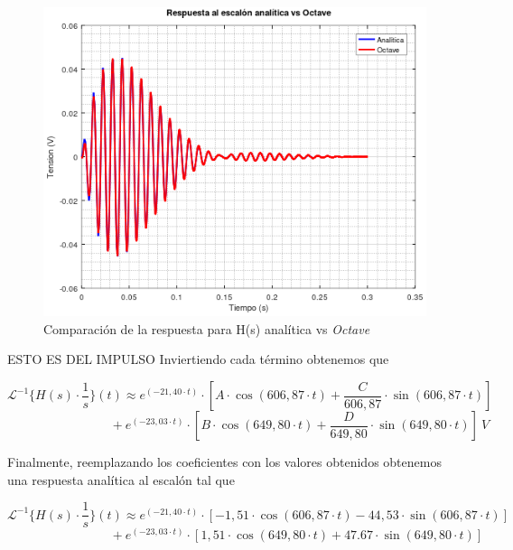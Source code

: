 \documentclass[11pt,a4paper]{report}
\begin{document}
\begin{figure}[h!]
\centering
\includegraphics[scale=1]{rtaEscalonAnaliticaVSOctave.png}
\caption{Comparación de la respuesta para H(s) analítica vs \textit{Octave}}
\end{figure}

\newpage
\bigskip
ESTO ES DEL IMPULSO
Inviertiendo cada término obtenemos que

\[\mathcal{L}^{-1}\{H(s) \cdot \frac{1}{s}\}(t) \approx e^{(-21,40 \cdot t)} \cdot [A \cdot \cos(606,87 \cdot t) + \frac{C}{606,87} \cdot \sin(606,87 \cdot t)]\] 
\[\phantom{asadsdasdasdasda} + e^{(-23,03 \cdot t)} \cdot [B \cdot \cos(649,80 \cdot t) + \frac{D}{649,80} \cdot \sin(649,80 \cdot t)] \ V\]

\bigskip
Finalmente, reemplazando los coeficientes con los valores obtenidos obtenemos una respuesta analítica al escalón tal que

\[\mathcal{L}^{-1}\{H(s) \cdot \frac{1}{s}\}(t) \approx e^{(-21,40 \cdot t)} \cdot [-1,51 \cdot \cos(606,87 \cdot t) -44,53 \cdot \sin(606,87 \cdot t)]\] 
\[\phantom{asadsdasdasdasda} + e^{(-23,03 \cdot t)} \cdot [1,51 \cdot \cos(649,80 \cdot t) + 47.67 \cdot \sin(649,80 \cdot t)]\]
\end{document}
